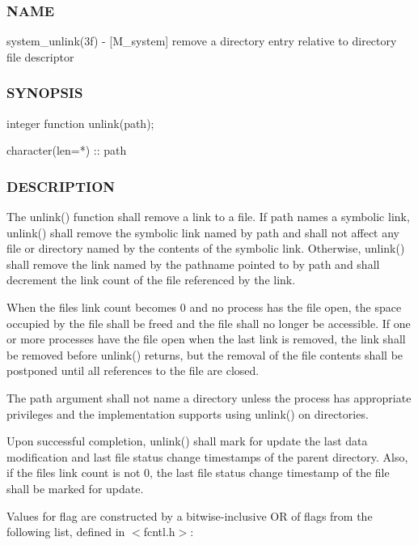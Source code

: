 \subsubsection*{N\+A\+ME}

system\+\_\+unlink(3f) -\/ \mbox{[}M\+\_\+system\mbox{]} remove a directory entry relative to directory file descriptor 

\subsubsection*{S\+Y\+N\+O\+P\+S\+IS}

\begin{DoxyVerb}integer function unlink(path);

 character(len=*) :: path
\end{DoxyVerb}


\subsubsection*{D\+E\+S\+C\+R\+I\+P\+T\+I\+ON}

The unlink() function shall remove a link to a file. If path names a symbolic link, unlink() shall remove the symbolic link named by path and shall not affect any file or directory named by the contents of the symbolic link. Otherwise, unlink() shall remove the link named by the pathname pointed to by path and shall decrement the link count of the file referenced by the link.

When the file\textquotesingle{}s link count becomes 0 and no process has the file open, the space occupied by the file shall be freed and the file shall no longer be accessible. If one or more processes have the file open when the last link is removed, the link shall be removed before unlink() returns, but the removal of the file contents shall be postponed until all references to the file are closed.

The path argument shall not name a directory unless the process has appropriate privileges and the implementation supports using unlink() on directories.

Upon successful completion, unlink() shall mark for update the last data modification and last file status change timestamps of the parent directory. Also, if the file\textquotesingle{}s link count is not 0, the last file status change timestamp of the file shall be marked for update.

Values for flag are constructed by a bitwise-\/inclusive OR of flags from the following list, defined in $<$fcntl.\+h$>$\+:

